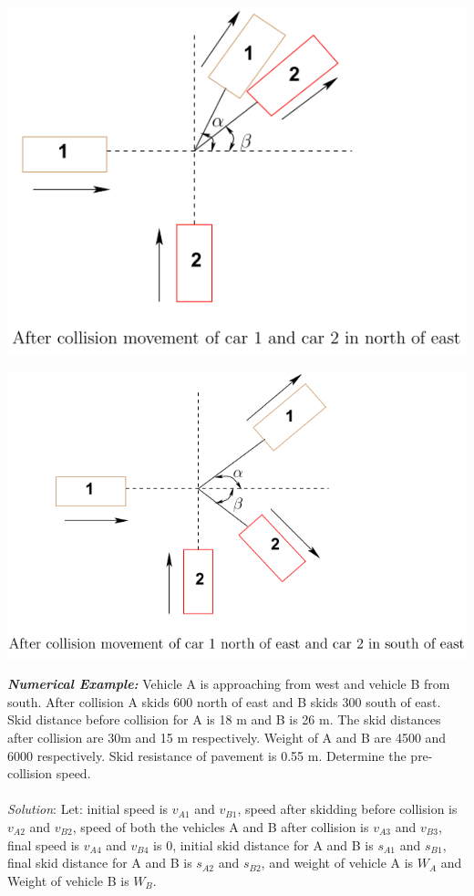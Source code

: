 \begin{center}
	\includegraphics[scale=0.5]{gfx/fig60.png}
\end{center}
\begin{center}
	\includegraphics[scale=0.5]{gfx/fig61.png}
\end{center}
\textbf{\textit{Numerical Example:}}
Vehicle A is approaching from west and vehicle B from south. After collision A skids 600 north of east and B skids 300 south of east. Skid distance before collision for A is 18 m and B is 26 m. The skid distances after collision are 30m and 15 m respectively. Weight of A and B are 4500 and 6000 respectively. Skid resistance of pavement is 0.55 m. Determine the pre-collision speed.\\\\
\textit{Solution}:
Let: initial speed is $ v_{A1} $ and $ v_{B1} $, speed after skidding before collision is $ v_{A2} $ and $ v_{B2} $, speed of both the vehicles A and B after collision is $ v_{A3} $ and $ v_{B3} $, final speed is $ v_{A4} $ and $ v_{B4} $ is 0, initial skid distance for A and B is $ s_{A1} $ and $ s_{B1} $, final skid distance for A and B is $ s_{A2} $ and $ s_{B2} $, and weight of vehicle A is $ W_A $ and Weight of vehicle B is $ W_B $.
